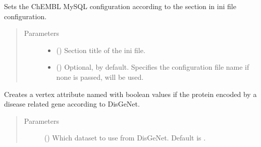 \documentclass[letterpaper,10pt,english]{sphinxmanual}
\begin{document}
\begin{fulllineitems}
\begin{fulllineitems}
\begin{itemize}
\end{itemize}

\end{fulllineitems}


\begin{fulllineitems}
\label{\detokenize{reference:pypath.main.PyPath.set_chembl_mysql}}
Sets the ChEMBL MySQL configuration according to the 
section in  ini file configuration.
\begin{quote}\begin{description}
\item[{Parameters}] \leavevmode\begin{itemize}
\item {} 
 () \textendash{} Section title of the ini file.

\item {} 
 () \textendash{} Optional,  by default. Specifies the configuration
file name if none is passed, 
will be used.

\end{itemize}

\end{description}\end{quote}

\end{fulllineitems}


\begin{fulllineitems}
\label{\detokenize{reference:pypath.main.PyPath.set_disease_genes}}
Creates a vertex attribute named  with boolean values 
if the protein encoded by a disease related gene according to
DisGeNet.
\begin{quote}\begin{description}
\item[{Parameters}] \leavevmode
{} () \textendash{} Which dataset to use from DisGeNet. Default is .


\end{description}
\end{quote}
\end{fulllineitems}
\end{fulllineitems}
\end{document}
